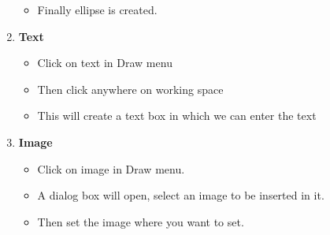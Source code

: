 \begin{enumerate}
\begin{itemize}
\item Finally ellipse is created.
\end{itemize}
\item \textbf{Text}
\begin{itemize}
\item Click on text in Draw menu
\item Then click anywhere on working space
\item This will create a text box in which we can enter the text
\end{itemize}
\item \textbf{Image}
\begin{itemize}
\item Click on image in Draw menu.
\item A dialog box will open, select an image to be inserted in it.
\item Then set the image where you want to set.
\end{itemize}
\end{enumerate}

